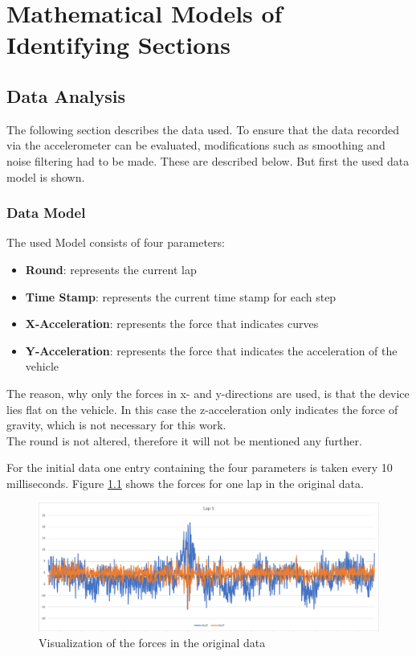 \chapter{Mathematical Models of Identifying Sections}

\section{Data Analysis}
The following section describes the data used. To ensure that the data recorded via the accelerometer can be evaluated, modifications such as smoothing and noise filtering had to be made. These are described below. But first the used data model is shown.

\subsection{Data Model}
The used Model consists of four parameters:
\begin{itemize}
	\item \textbf{Round}: represents the current lap
	\item \textbf{Time Stamp}: represents the current time stamp for each step
	\item \textbf{X-Acceleration}: represents the force that indicates curves
	\item \textbf{Y-Acceleration}: represents the force that indicates the acceleration of the vehicle
\end{itemize}
The reason, why only the forces in x- and y-directions are used, is that the device lies flat on the vehicle. In this case the z-acceleration only indicates the force of gravity, which is not necessary for this work.\\
The round is not altered, therefore it will not be mentioned any further. 

For the initial data one entry containing the four parameters is taken every 10 milliseconds. Figure \ref{fig:origFor} shows the forces for one lap in the original data.

\begin{figure}[H]
	\centering
	\includegraphics[scale= 0.42]{Pictures/originalForces.png}
	\caption{Visualization of the forces in the original data}
	\label{fig:origFor}
\end{figure}

